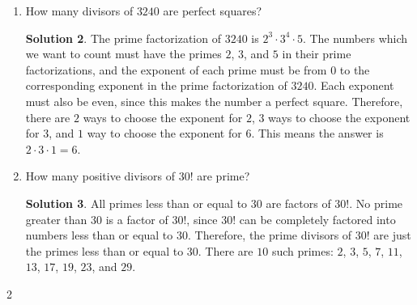 \documentclass{article}
\theoremstyle{definition}
\newtheorem*{solution}{Solution}
\begin{document}
\begin{multicols}{2}
\begin{enumerate}
\begin{solution}
                W must be one of the letters of this state, since it's the $23$rd letter of the
                alphabet and no multiple of $23$ is a letter.
                Clearly, the other letters can't be C, C, C, and E.
                So, we have to multiply some factors and see what letters we get.
                If we use $3 \cdot 3 = 9$ and $3 \cdot 5 = 15$, we get the letters I and O.
                Now we have three letters: W, I, and O.
                Since $A = 1$, we have $9 \cdot 15 \cdot 23 \cdot 1 = 3105$.
                These letters can be arranged to spell the name of the state in the US
                that has a product value of $3105$, which is .
            \end{solution}
        \item How many divisors of $3240$ are perfect squares?
            \begin{solution}
                The prime factorization of $3240$ is $2^3 \cdot 3^4 \cdot 5$.
                The numbers which we want to count must have the primes $2$, $3$, and $5$ in their
                prime factorizations, and the exponent of each prime must be from $0$ to the
                corresponding exponent in the prime factorization of $3240$.
                Each exponent must also be even, since this makes the number a perfect square.
                Therefore, there are $2$ ways to choose the exponent for $2$, $3$ ways to choose
                the exponent for $3$, and $1$ way to choose the exponent for $6$.
                This means the answer is $2 \cdot 3 \cdot 1 = \boxed{6}$.
            \end{solution}
        \item How many positive divisors of $30!$ are prime?
            \begin{solution}
                All primes less than or equal to $30$ are factors of $30!$.
                No prime greater than $30$ is a factor of $30!$,
                since $30!$ can be completely factored into numbers less than or equal to $30$.
                Therefore, the prime divisors of $30!$ are just the primes less than
                or equal to $30$.
                There are $\boxed{10}$ such primes:
                $2$, $3$, $5$, $7$, $11$, $13$, $17$, $19$, $23$, and $29$.
            \end{solution}
    \end{enumerate}
\end{multicols}{2}
\end{document}
